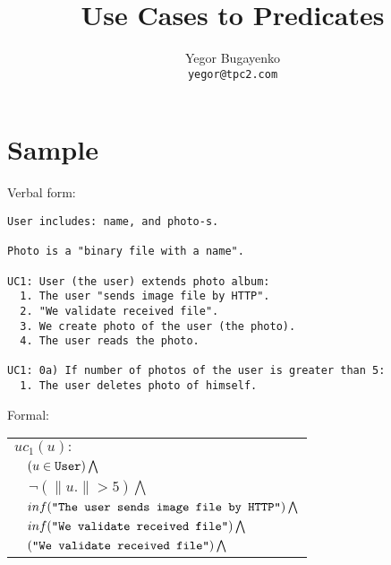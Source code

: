\documentclass{article}
\begin{document}
\title{Use Cases to Predicates}
\author{Yegor Bugayenko\\\texttt{yegor@tpc2.com}}
\maketitle

\section{Sample}

Verbal form:

\begin{verbatim}
User includes: name, and photo-s.
  
Photo is a "binary file with a name".
    
UC1: User (the user) extends photo album:
  1. The user "sends image file by HTTP".
  2. "We validate received file".
  3. We create photo of the user (the photo).
  4. The user reads the photo.

UC1: 0a) If number of photos of the user is greater than 5:
  1. The user deletes photo of himself.
\end{verbatim}

Formal:
    
\newcommand{\type}[1]{\mbox{\texttt{#1}}}
\vspace*{1em}
\begin{tabular}{l}
$uc_1(u):$ \\
$\quad (u \in \type{User}) \bigwedge$ \\
$\quad \neg(\| u . \| > 5) \bigwedge$ \\
$\quad inf(\type{"The user sends image file by HTTP"}) \bigwedge$ \\
$\quad inf(\type{"We validate received file"}) \bigwedge$ \\
$\quad (\type{"We validate received file"}) \bigwedge$ \\
\end{tabular}
    
\end{document}
